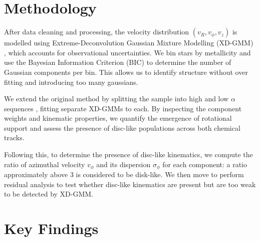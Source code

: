 \documentclass[a4paper,10pt]{article}
\begin{document}
\begin{multicols}{2}
\section*{Methodology}

After data cleaning and processing, the velocity distribution $(v_R, v_\phi, v_z)$ is modelled using Extreme-Deconvolution Gaussian Mixture Modelling (XD-GMM) \cite{Bovy2011}\cite{pygmmis}, 
which accounts for observational uncertainties. We bin stars by metallicity and use the Bayesian Information Criterion (BIC) to determine the 
number of Gaussian components per bin. This allows us to identify structure without over fitting and introducing too many gaussians.


We extend the original method by splitting the sample into high and low $\alpha$ sequences \citep{Vis2024}, fitting separate 
XD-GMMs to each. By inspecting the component weights and kinematic properties, we quantify the emergence of rotational support 
and assess the presence of disc-like populations across both chemical tracks.

Following this, to determine the presence of disc-like kinematics, we compute the ratio of azimuthal velocity $v_\phi$ and its 
dispersion $\sigma_\phi$ for each component: a ratio approximately above 3 is considered to be disk-like. 
We then move to perform residual analysis to test whether disc-like kinematics are present
but are too weak to be detected by XD-GMM.

\section*{Key Findings}


\end{multicols}
\end{document}
